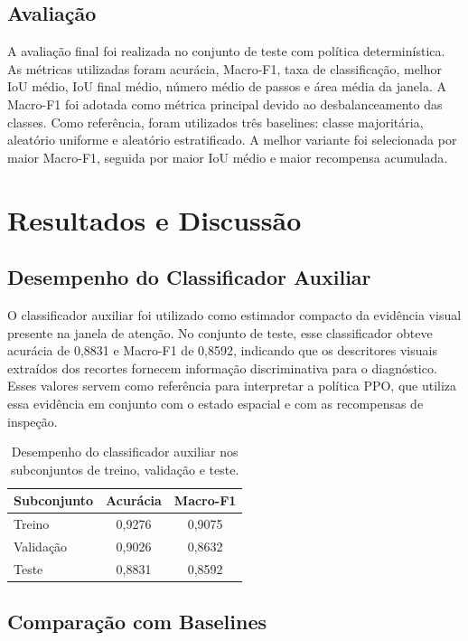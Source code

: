 \subsection{Avaliação}

A avaliação final foi realizada no conjunto de teste com política determinística. As
métricas utilizadas foram acurácia, Macro-F1, taxa de classificação, melhor IoU médio,
IoU final médio, número médio de passos e área média da janela. A Macro-F1 foi adotada
como métrica principal devido ao desbalanceamento das classes. Como referência, foram
utilizados três baselines: classe majoritária, aleatório uniforme e aleatório
estratificado. A melhor variante foi selecionada por maior Macro-F1, seguida por maior
IoU médio e maior recompensa acumulada.

\section{Resultados e Discussão}

\subsection{Desempenho do Classificador Auxiliar}

O classificador auxiliar foi utilizado como estimador compacto da evidência visual
presente na janela de atenção. No conjunto de teste, esse classificador obteve acurácia
de 0,8831 e Macro-F1 de 0,8592, indicando que os descritores visuais extraídos dos
recortes fornecem informação discriminativa para o diagnóstico. Esses valores servem
como referência para interpretar a política PPO, que utiliza essa evidência em conjunto
com o estado espacial e com as recompensas de inspeção.

\begin{table}[htbp]
\centering
\caption{Desempenho do classificador auxiliar nos subconjuntos de treino, validação e teste.}
\label{tab:aux_classifier}
\begin{tabular}{lcc}
\hline
\textbf{Subconjunto} & \textbf{Acurácia} & \textbf{Macro-F1} \\
\hline
Treino & 0,9276 & 0,9075 \\
Validação & 0,9026 & 0,8632 \\
Teste & 0,8831 & 0,8592 \\
\hline
\end{tabular}
\end{table}

\subsection{Comparação com Baselines}

